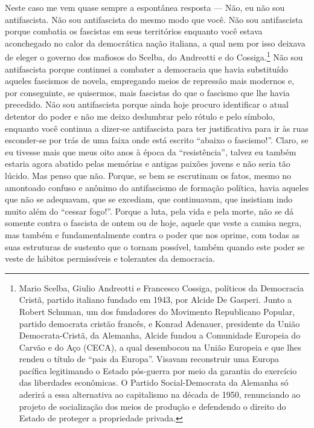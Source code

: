 Neste caso me vem quase sempre a espontânea resposta --- Não, eu não sou
antifascista. Não sou antifascista do mesmo modo que você. Não sou
antifascista porque combatia os fascistas em seus territórios enquanto
você estava aconchegado no calor da democrática nação italiana, a qual
nem por isso deixava de eleger o governo dos mafiosos do Scelba, do
Andreotti e do Cossiga.\footnote{Mario Scelba, Giulio Andreotti e Francesco Cossiga, políticos da
  Democracia Cristã, partido italiano fundado em 1943, por Alcide De
  Gasperi. Junto a Robert Schuman, um dos fundadores do Movimento
  Republicano Popular, partido democrata cristão francês, e Konrad
  Adenauer, presidente da União Democrata-Cristã, da Alemanha, Alcide
  fundou a Comunidade Europeia do Carvão e do Aço (CECA), a qual
  desembocou na União Europeia e que lhes rendeu o título de ``pais da
  Europa''. Visavam reconstruir uma Europa pacífica legitimando o Estado
  pós-guerra por meio da garantia do exercício das liberdades
  econômicas. O Partido Social-Democrata da Alemanha só aderirá a essa
  alternativa ao capitalismo na década de 1950, renunciando ao projeto
  de socialização dos meios de produção e defendendo o direito do Estado
  de proteger a propriedade privada.} Não sou antifascista porque continuei a combater a
democracia que havia substituído aqueles fascismos de novela, empregando
meios de repressão mais modernos e, por conseguinte, se quisermos, mais
fascistas do que o fascismo que lhe havia precedido. Não sou
antifascista porque ainda hoje procuro identificar o atual detentor do
poder e não me deixo deslumbrar pelo rótulo e pelo símbolo, enquanto
você continua a dizer-se antifascista para ter justificativa para ir às
ruas esconder-se por trás de uma faixa onde está escrito ``abaixo o
fascismo!''. Claro, se eu tivesse mais que meus oito anos à época da
``resistência'', talvez eu também estaria agora abatido pelas memórias e
antigas paixões jovens e não seria tão lúcido. Mas penso que não.
Porque, se bem se escrutinam os fatos, mesmo no amontoado confuso e
anônimo do antifascismo de formação política, havia aqueles que não se
adequavam, que se excediam, que continuavam, que insistiam indo muito
além do ``cessar fogo!''. Porque a luta, pela vida e pela morte, não se
dá somente contra o fascista de ontem ou de hoje, aquele que veste a
camisa negra, mas também e fundamentalmente contra o poder que nos
oprime, com todas as suas estruturas de sustento que o tornam possível,
também quando este poder se veste de hábitos permissíveis e tolerantes
da democracia.

